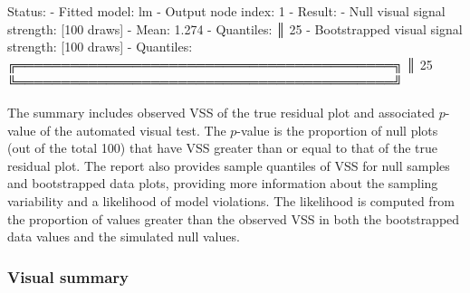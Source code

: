 \documentclass[
doublespace,
  times]{anzsauth}
\providecommand{\DIFmodbegin}{} %
\providecommand{\DIFmodend}{} %
\begin{document}
\DIFmodbegin
\begin{DIFverbatim}[alsolanguage=DIFcode]




 Status:
  - Fitted model: lm
     - Output node index: 1
  - Result:
     - Null visual signal strength: [100 draws]
        - Mean: 1.274
        - Quantiles:
           ║  25%
     - Bootstrapped visual signal strength: [100 draws]
        - Quantiles:
           ╔══════════════════════════════════════════╗
           ║  25%
           ╚══════════════════════════════════════════╝
\end{DIFverbatim}
\DIFmodend

The summary includes observed VSS of the true residual plot and
associated \(p\)-value of the automated visual test. The \(p\)-value is
the proportion of null plots (out of the total 100) that have VSS
greater than or equal to that of the true residual plot. The report also
provides sample quantiles of VSS for null samples and bootstrapped data
plots, providing more information about the sampling variability and a
likelihood of model violations. The likelihood is computed from the
proportion of values greater than the observed VSS in both the
bootstrapped data values and the simulated null values.

\subsubsection{Visual summary}\label{sec-autovi-visual}
\end{document}
